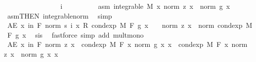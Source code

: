 \begin{isabellebody}
\ \ \ \ \ \ \isacommand{{\isacharbraceleft}{\kern0pt}}\isamarkupfalse%
\isanewline
\ \ \ \ \ \ \ \ \isamarkupfalse%
\ i\isanewline
\ \ \ \ \ \ \ \ \isamarkupfalse%
\ asm{\isacharcolon}{\kern0pt}\ {\isachardoublequoteopen}integrable\ M\ {\isacharparenleft}{\kern0pt}{\isasymlambda}x{\isachardot}{\kern0pt}\ norm\ {\isacharparenleft}{\kern0pt}z\ x{\isacharparenright}{\kern0pt}\ {\isacharasterisk}{\kern0pt}\ norm\ {\isacharparenleft}{\kern0pt}g\ x{\isacharparenright}{\kern0pt}{\isacharparenright}{\kern0pt}{\isachardoublequoteclose}\ \isamarkupfalse%
\ asm{\isacharparenleft}{\kern0pt}{}{\isacharparenright}{\kern0pt}{\isacharbrackleft}{\kern0pt}THEN\ integrable{\isacharunderscore}{\kern0pt}norm{\isacharbrackright}{\kern0pt}\ \isamarkupfalse%
\ simp\isanewline
\ \ \ \ \ \ \ \ \isamarkupfalse%
\ {\isachardoublequoteopen}AE\ x\ in\ {\isacharquery}{\kern0pt}F{\isachardot}{\kern0pt}\ norm\ {\isacharparenleft}{\kern0pt}s\ i\ x\ {\isacharasterisk}{\kern0pt}\isactrlsub R\ cond{\isacharunderscore}{\kern0pt}exp\ M\ F\ g\ x{\isacharparenright}{\kern0pt}\ {\isasymle}\ {}\ {\isacharasterisk}{\kern0pt}\ norm\ {\isacharparenleft}{\kern0pt}z\ x{\isacharparenright}{\kern0pt}\ {\isacharasterisk}{\kern0pt}\ norm\ {\isacharparenleft}{\kern0pt}cond{\isacharunderscore}{\kern0pt}exp\ M\ F\ g\ x{\isacharparenright}{\kern0pt}{\isachardoublequoteclose}\ \isamarkupfalse%
\ s{\isacharunderscore}{\kern0pt}is{\isacharparenleft}{\kern0pt}{}{\isacharparenright}{\kern0pt}\ \isamarkupfalse%
\ {\isacharparenleft}{\kern0pt}fastforce\ simp\ add{\isacharcolon}{\kern0pt}\ mult{\isacharunderscore}{\kern0pt}mono{\isacharparenright}{\kern0pt}\isanewline
\ \ \ \ \ \ \ \ \isamarkupfalse%
\ \isamarkupfalse%
\ {\isachardoublequoteopen}AE\ x\ in\ {\isacharquery}{\kern0pt}F{\isachardot}{\kern0pt}\ norm\ {\isacharparenleft}{\kern0pt}z\ x{\isacharparenright}{\kern0pt}\ {\isacharasterisk}{\kern0pt}\ cond{\isacharunderscore}{\kern0pt}exp\ M\ F\ {\isacharparenleft}{\kern0pt}{\isasymlambda}x{\isachardot}{\kern0pt}\ norm\ {\isacharparenleft}{\kern0pt}g\ x{\isacharparenright}{\kern0pt}{\isacharparenright}{\kern0pt}\ x\ {\isacharequal}{\kern0pt}\ cond{\isacharunderscore}{\kern0pt}exp\ M\ F\ {\isacharparenleft}{\kern0pt}{\isasymlambda}x{\isachardot}{\kern0pt}\ norm\ {\isacharparenleft}{\kern0pt}z\ x{\isacharparenright}{\kern0pt}\ {\isacharasterisk}{\kern0pt}\ norm\ {\isacharparenleft}{\kern0pt}g\ x{\isacharparenright}{\kern0pt}{\isacharparenright}{\kern0pt}\ x{\isachardoublequoteclose}\ \isamarkupfalse%

\end{isabellebody}
